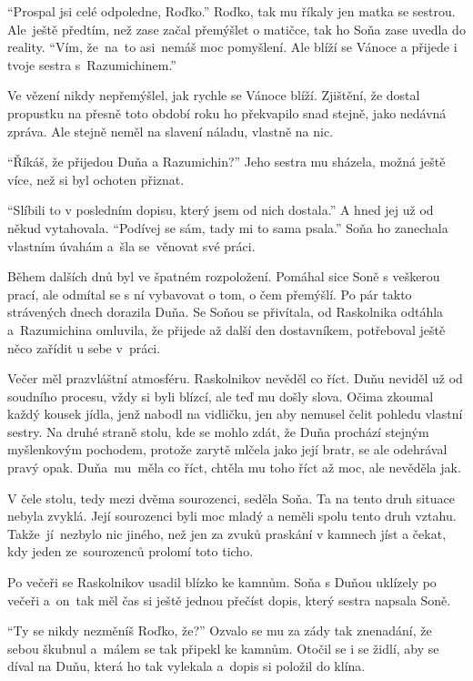 \documentclass[11pt]{article}
\begin{document}
\enquote{Prospal jsi celé odpoledne, Roďko.} Roďko, tak mu říkaly jen matka se sestrou. Ale~ještě předtím, než zase začal přemýšlet o matičce, tak ho Soňa zase uvedla do reality. \enquote{Vím, že~na~to asi~nemáš moc pomyšlení. Ale blíží se Vánoce a přijede i tvoje sestra s~Razumichinem.}

Ve vězení nikdy nepřemýšlel, jak rychle se Vánoce blíží. Zjištění, že dostal propustku na přesně toto období roku ho překvapilo snad stejně, jako nedávná zpráva. Ale stejně neměl na slavení náladu, vlastně na nic.

\enquote{Říkáš, že přijedou Duňa a Razumichin?} Jeho sestra mu sházela, možná ještě více, než si byl ochoten přiznat.

\enquote{Slíbili to v posledním dopisu, který jsem od nich dostala.} A hned jej už od někud vytahovala. \enquote{Podívej se sám, tady mi to sama psala.} Soňa ho zanechala vlastním úvahám a~šla se~věnovat své práci.

\hspace{1em}

Během dalších dnů byl ve špatném rozpoložení. Pomáhal sice Soně s veškerou prací, ale odmítal se s ní vybavovat o tom, o čem přemýšlí. Po pár takto strávených dnech dorazila Duňa. Se Soňou se přivítala, od Raskolnika odtáhla a~Razumichina omluvila, že přijede až další den dostavníkem, potřeboval ještě něco zařídit u sebe v~práci.

Večer měl prazvláštní atmosféru. Raskolnikov nevěděl co říct. Duňu neviděl už od soudního procesu, vždy si byli blízcí, ale teď mu došly slova. Očima zkoumal každý kousek jídla, jenž nabodl na vidličku, jen aby nemusel čelit pohledu vlastní sestry. Na druhé straně stolu, kde se mohlo zdát, že Duňa prochází stejným myšlenkovým pochodem, protože zarytě mlčela jako její bratr, se ale odehrával pravý opak. Duňa~mu~měla co říct, chtěla mu toho říct až moc, ale nevěděla jak.

V čele stolu, tedy mezi dvěma sourozenci, seděla Soňa. Ta na tento druh situace nebyla zvyklá. Její sourozenci byli moc mladý a neměli spolu tento druh vztahu. Takže~jí~nezbylo nic jiného, než jen za zvuků praskání v kamnech jíst a čekat, kdy jeden ze~sourozenců prolomí toto ticho.

\hspace{1em}

Po večeři se Raskolnikov usadil blízko ke kamnům. Soňa s Duňou uklízely po večeři a~on~tak měl čas si ještě jednou přečíst dopis, který sestra napsala Soně.

\enquote{Ty se nikdy nezměníš Roďko, že?} Ozvalo se mu za zády tak znenadání, že sebou škubnul a~málem se tak připekl ke kamnům. Otočil se i se židlí, aby se díval na Duňu, která ho tak vylekala a~dopis si položil do klína.
\end{document}
